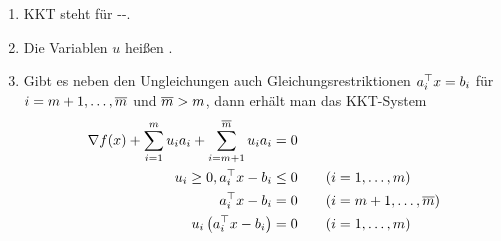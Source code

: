 \begin{bemerkung} %
	\begin{enumerate}[nolistsep]
		\item KKT steht für --.
		\item Die Variablen $u$ heißen .
		\item Gibt es neben den Ungleichungen auch Gleichungsrestriktionen $a_i^{\top}x = b_i$ für $i = m+1, \dots , \overline{m}$ und $\overline{m} > m$, dann erhält man das KKT-System
		\begin{align}
			\begin{split}
			\nabla f(x) + \sum_{i=1}^m u_i a_i + \sum_{i=m+1}^{\overline{m}} u_i a_i &= 0 \\
			u_i \ge 0 , a_i^{\top}x - b_i &\le 0 \qquad (i = 1, \dots , m) \\
			a_i^{\top}x - b_i &= 0 \qquad (i = m+1, \dots , \overline{m}) \\
			u_i \left( a_i^{\top}x - b_i \right) &= 0 \qquad (i = 1 , \dots , m)
			\end{split}
		\end{align}
	\end{enumerate}
\end{bemerkung}